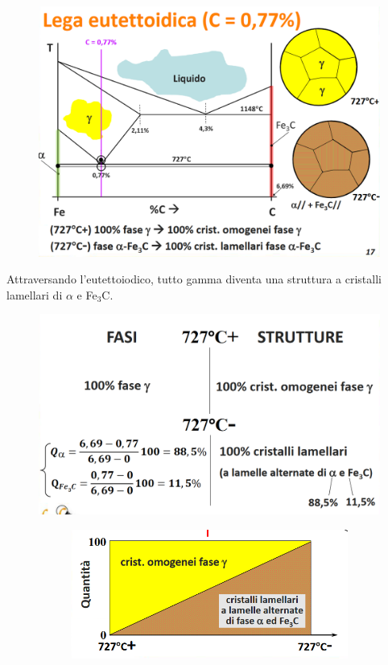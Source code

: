 \documentclass{article}
\begin{document}
{\begin{figure}[h!]
                \includegraphics[width=.85\linewidth]{L12 - Diagramma Fe-C - 0,77C - Cambio di Struttura 2.png}
            \end{figure}
            Attraversando l'eutettoiodico, tutto gamma diventa una struttura a cristalli lamellari di $\alpha$ e Fe$_3$C.
            \begin{figure}[h!]
                \centering
                \includegraphics[width=.85\linewidth]{L12 - Diagramma Fe-C - 0,77C - Calcolo all'eutettoidico.png}
            \end{figure}
            \begin{figure}[h!]
                \centering
                \begin{subfigure}{.45\linewidth}
                    \includegraphics[width=\linewidth]{L12 - Diagramma Fe-C - 0,77C - Cambio costituenti.png}

\end{subfigure}
\end{figure}}
\end{document}
